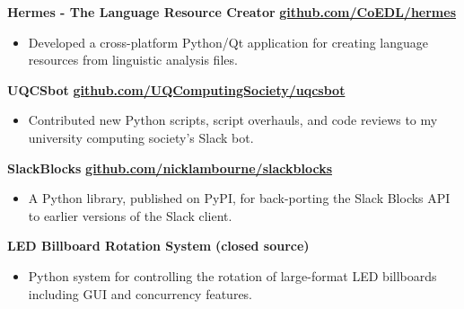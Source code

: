 \documentclass[a4paper]{article}
\newenvironment{singleitem}
{   \small
    \vspace{0pt}
    \begin{itemize}
    \setlength{\itemsep}{0pt}
    \setlength{\parskip}{0pt}
    \setlength{\parsep}{0pt}   }
{\end{itemize} \vspace{1pt}	}
\begin{document}
\textbf{{Hermes - The Language Resource Creator}} \hfill \textbf{\href{https://github.com/CoEDL/hermes}{github.com/CoEDL/hermes}}
\begin{singleitem}
	\item Developed a cross-platform Python/Qt application for creating language resources from linguistic analysis files.
\end{singleitem}


\textbf{UQCSbot} \hfill \textbf{\href{https://github.com/UQComputingSociety/uqcsbot}{github.com/UQComputingSociety/uqcsbot}}
\begin{singleitem}
	\item Contributed new Python scripts, script overhauls, and code reviews to my university computing society's Slack bot.
\end{singleitem}

\textbf{SlackBlocks} \hfill \textbf{\href{https://github.com/nicklambourne/slackblocks}{github.com/nicklambourne/slackblocks}}
\begin{singleitem}
	\item A Python library, published on PyPI, for back-porting the Slack Blocks API to earlier versions of the Slack client.
\end{singleitem}

\textbf{LED Billboard Rotation System} \hfill \textbf{(closed source)}
\begin{singleitem}
	\item Python system for controlling the rotation of large-format LED billboards including GUI and concurrency features.
\end{singleitem}

\vspace{1mm}
\end{document}
